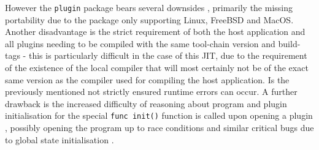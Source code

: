 However the \texttt{plugin} package bears several downsides
\cite[Warnings]{go_plugin}, primarily the missing portability due to the
package only supporting Linux, FreeBSD and MacOS. Another disadvantage is the
strict requirement of both the host application and all plugins needing to be
compiled with the same tool-chain version and build-tags - this is particularly
difficult in the case of this JIT, due to the requirement of the existence of
the local compiler that will most certainly not be of the exact same version as
the compiler used for compiling the host application. Is the previously
mentioned not strictly ensured runtime errors can occur. A further drawback is
the increased difficulty of reasoning about program and plugin initialisation
for the special \texttt{func init()} function is called upon opening a
plugin \cite[Overview]{go_plugin}, possibly opening the program up to race
conditions and similar critical bugs due to global state initialisation
\cite[The init function]{go_effective}.
